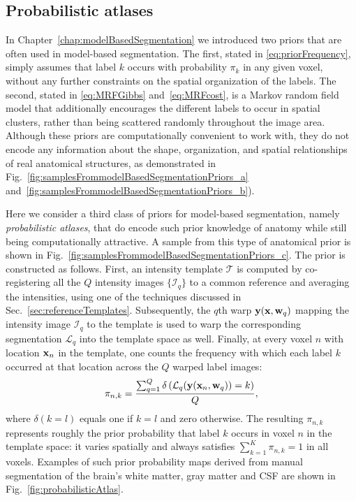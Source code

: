 \documentclass[10pt,twoside]{book}
\begin{document}
\subsection{Probabilistic atlases}

In Chapter~\ref{chap:modelBasedSegmentation} we introduced two priors that are often used in model-based segmentation. The first, stated
in \eqref{eq:priorFrequency}, simply assumes that label $k$ occurs with probability $\pi_k$ in any given voxel, without any 
further constraints on the spatial organization of the 
labels. The second, stated in \eqref{eq:MRFGibbs} and~\eqref{eq:MRFcost}, 
is a Markov random field model
that additionally encourages the different labels to occur in spatial clusters, rather than being scattered randomly throughout the image area.
Although these priors are computationally convenient to work with, they do not encode any information about the shape, organization,
and spatial relationships of real anatomical structures, as demonstrated in Fig.~\ref{fig:samplesFrommodelBasedSegmentationPriors_a} and~\ref{fig:samplesFrommodelBasedSegmentationPriors_b}).

Here we consider a third class of priors for model-based segmentation, namely \emph{probabilistic atlases}, that do encode such prior knowledge of anatomy
while still being computationally attractive. A 
sample from this type of anatomical prior
is shown in Fig.~\ref{fig:samplesFrommodelBasedSegmentationPriors_c}.
The prior is constructed as follows. First, an intensity template $\mathcal{T}$ is computed by co-registering all the $Q$ intensity
images $\{\mathcal{I}_q\}$ to a common reference and averaging the intensities, using one of the techniques discussed in 
Sec.~\ref{sec:referenceTemplates}. 
Subsequently, the $q$th warp $\mathbf{y}(\mathbf{x}, \mathbf{w}_q)$ mapping the intensity image $\mathcal{I}_q$ to the template is used
to warp the corresponding segmentation $\mathcal{L}_q$ into the template space as well. Finally, at every voxel $n$ with location $\mathbf{x}_n$ 
in the template, 
one counts 
the frequency with which each label $k$ occurred at that location across the $Q$ warped label images: 
\begin{equation}
  \pi_{n,k} = \frac{ \sum_{q=1}^Q \delta \left( \mathcal{L}_q( \mathbf{y}( \mathbf{x}_n, \mathbf{w}_q ) ) = k \right) }
                 {Q},
\end{equation}
where $\delta( k = l )$ equals one if $k = l$ and zero otherwise.
The resulting $\pi_{n,k}$ represents roughly the prior probability that label $k$ occurs in voxel $n$ in the template space: 
it varies spatially and always satisfies $\sum_{k=1}^K \pi_{n,k} = 1$ in all voxels. Examples of such prior probability maps
derived from manual segmentation of the brain's white matter, gray matter and CSF are shown in Fig.~\ref{fig:probabilisticAtlas}.
\end{document}
